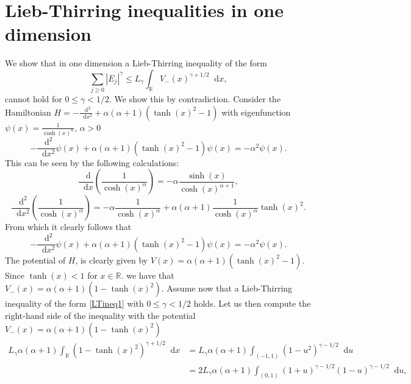 \documentclass[a4paper,11pt]{article}
\newcommand{\abs}[1]{\left\lvert #1 \right\rvert}
\newcommand*\diff{\mathop{}\!\mathrm{d}}
\newcommand{\R}{\mathbb{R}}
\numberwithin{equation}{section}
\begin{document}
\section{Lieb-Thirring inequalities in one dimension}
We show that in one dimension a Lieb-Thirring inequality of the form \begin{equation}
\sum_{j\geq0}\abs{E_j}^\gamma\leq L_\gamma\int_{\R}V_{-}(x)^{\gamma+1/2}\diff x, \label{LTineq1}
\end{equation}
cannot hold for $ 0\leq\gamma < 1/2 $. We show this by contradiction. Consider the Hamiltonian $ H=-\frac{\diff^2}{\diff x^2}+\alpha(\alpha+1)(\tanh(x)^2-1) $ with eigenfunction $ \psi(x)=\frac{1}{\cosh(x)^\alpha}$, $ \alpha>0 $
\begin{equation}
-\frac{\diff^2}{\diff x^2}\psi(x)+\alpha(\alpha+1)(\tanh(x)^2-1)\psi(x)=-\alpha^2\psi(x).
\end{equation}
This can be seen by the following calculations:
\begin{equation}
\frac{\diff}{\diff x}\left(\frac{1}{\cosh(x)^\alpha}\right)=-\alpha\frac{\sinh(x)}{\cosh(x)^{\alpha+1}},
\end{equation}
\begin{equation}
\frac{\diff^2}{\diff x^2}\left(\frac{1}{\cosh(x)^\alpha}\right)=-\alpha\frac{1}{\cosh(x)^\alpha}+\alpha(\alpha+1)\frac{1}{\cosh(x)^\alpha}\tanh(x)^2.
\end{equation}
From which it clearly follows that\begin{equation}
-\frac{\diff^2}{\diff x^2}\psi(x)+\alpha(\alpha+1)(\tanh(x)^2-1)\psi(x)=-\alpha^2\psi(x).
\end{equation}
The potential of $ H $, is clearly given by $ V(x)=\alpha(\alpha+1)(\tanh(x)^2-1) $. Since $ \tanh(x)<1 $ for $ x\in\R $. we have that $ V_-(x)=\alpha(\alpha+1)(1-\tanh(x)^2) $. Assume now that a Lieb-Thirring inequality of the form \eqref{LTineq1} with $ 0\leq\gamma<1/2 $ holds. Let us then compute the right-hand side of the inequality with the potential $ V_-(x)=\alpha(\alpha+1)(1-\tanh(x)^2) $\begin{equation}
\begin{aligned}
L_\gamma\alpha(\alpha+1)\int_{\R}(1-\tanh(x)^2)^{\gamma+1/2} \diff x&=L_\gamma\alpha(\alpha+1)\int_{(-1,1)}(1-u^2)^{\gamma-1/2} \diff u\\
&=2L_\gamma\alpha(\alpha+1)\int_{(0,1)}(1+u)^{\gamma-1/2}(1-u)^{\gamma-1/2} \diff u,\label{int1}
\end{aligned}
\end{equation}
\end{document}

